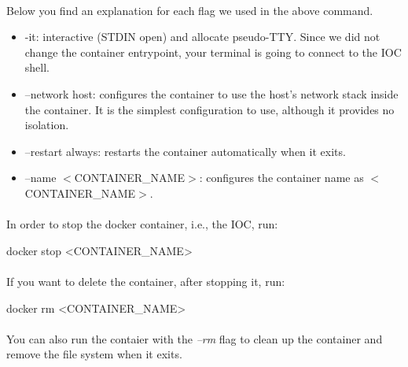 \documentclass[openany]{article}
\begin{document}
        \paragraph{} Below you find an explanation for each flag we used in the above command.

        \begin{itemize}
          \item -it: interactive (STDIN open) and allocate pseudo-TTY. Since we did not change the container entrypoint, your terminal is going to connect to the IOC shell.
          \item --network host: configures the container to use the host's network stack inside the container. It is the simplest configuration to use, although it provides no isolation.
          \item --restart always: restarts the container automatically when it exits.
          \item --name $<$CONTAINER\_NAME$>$: configures the container name as $<$CONTAINER\_NAME$>$.
        \end{itemize}

        \paragraph{} In order to stop the docker container, i.e., the IOC, run:

        \vspace{1mm}
        \begin{code}
docker stop <CONTAINER_NAME>
        \end{code}
        \vspace{1mm}

        \paragraph{} If you want to delete the container, after stopping it, run:

        \vspace{1mm}
        \begin{code}
docker rm <CONTAINER_NAME>
        \end{code}
        \vspace{1mm}

        \paragraph{} You can also run the contaier with the \emph{--rm} flag to clean up the container and remove the file system when it exits.
\end{document}
